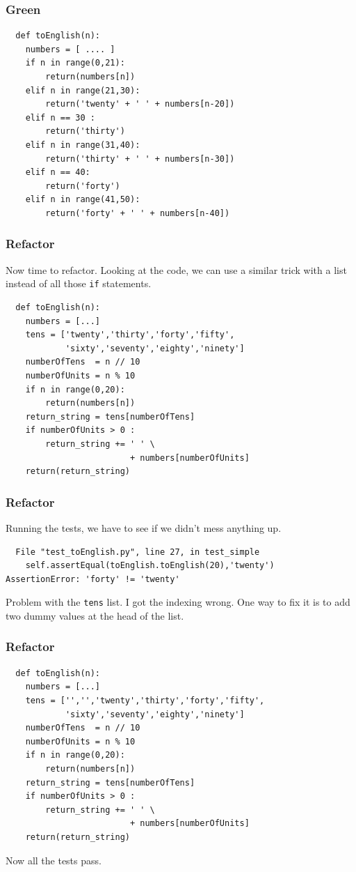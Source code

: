 \documentclass{beamer}
\begin{document}
\begin{frame}[fragile]
  \frametitle{Green}
\begin{lstlisting}
  def toEnglish(n):
    numbers = [ .... ]
    if n in range(0,21):
        return(numbers[n])
    elif n in range(21,30):
        return('twenty' + ' ' + numbers[n-20])
    elif n == 30 :
        return('thirty')
    elif n in range(31,40):
        return('thirty' + ' ' + numbers[n-30])
    elif n == 40:
        return('forty')
    elif n in range(41,50):
        return('forty' + ' ' + numbers[n-40])
\end{lstlisting}
\end{frame}
\begin{frame}[fragile]
\frametitle{Refactor}
Now time to refactor. Looking at the code, we can use a similar trick
with a list instead of all those {\tt if} statements.
\begin{lstlisting}
  def toEnglish(n):
    numbers = [...]
    tens = ['twenty','thirty','forty','fifty',
            'sixty','seventy','eighty','ninety']
    numberOfTens  = n // 10
    numberOfUnits = n % 10
    if n in range(0,20):
        return(numbers[n])
    return_string = tens[numberOfTens]
    if numberOfUnits > 0 :
        return_string += ' ' \
                         + numbers[numberOfUnits]
    return(return_string)
\end{lstlisting}
\end{frame}
\begin{frame}[fragile]
  \frametitle{Refactor}
Running the tests, we have to see if we didn't mess anything up.
\begin{verbatim}
  File "test_toEnglish.py", line 27, in test_simple
    self.assertEqual(toEnglish.toEnglish(20),'twenty')
AssertionError: 'forty' != 'twenty'
\end{verbatim}
Problem with the {\tt tens} list. I got the indexing wrong. One way to
fix it is to add two dummy values at the head of the list.
\end{frame}
\begin{frame}[fragile]
\frametitle{Refactor}
\begin{lstlisting}
  def toEnglish(n):
    numbers = [...]
    tens = ['','','twenty','thirty','forty','fifty',
            'sixty','seventy','eighty','ninety']
    numberOfTens  = n // 10
    numberOfUnits = n % 10
    if n in range(0,20):
        return(numbers[n])
    return_string = tens[numberOfTens]
    if numberOfUnits > 0 :
        return_string += ' ' \
                         + numbers[numberOfUnits]
    return(return_string)
\end{lstlisting}  
Now all the tests pass.
\end{frame}
\end{document}
